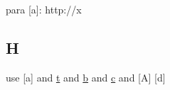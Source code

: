para {[}a{]}: http://x

\subsection{H}\label{h}

use {[}a{]} and \href{http://y}{t} and \href{http://y}{b} and \href{}{c}
and {[}A{]} {[}d{]}
